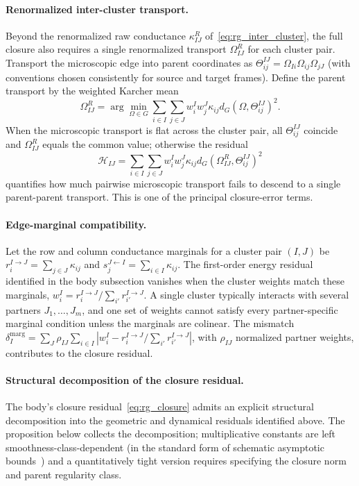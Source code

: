 \documentclass[11pt]{article}
\begin{document}
\paragraph{Renormalized inter-cluster transport.}
Beyond the renormalized raw conductance $\kappa_{IJ}^R$ of~\eqref{eq:rg_inter_cluster}, the full closure also requires a single renormalized transport $\Omega_{IJ}^R$ for each cluster pair. Transport the microscopic edge into parent coordinates as $\Theta_{ij}^{IJ} = \Omega_{Ii}\Omega_{ij}\Omega_{jJ}$ (with conventions chosen consistently for source and target frames). Define the parent transport by the weighted Karcher mean
\begin{equation}
\Omega_{IJ}^R = \arg\min_{\Omega \in G} \sum_{i \in I}\sum_{j \in J} w_i^I w_j^J \kappa_{ij} d_G(\Omega, \Theta_{ij}^{IJ})^2.
\end{equation}
When the microscopic transport is flat across the cluster pair, all $\Theta_{ij}^{IJ}$ coincide and $\Omega_{IJ}^R$ equals the common value; otherwise the residual
\begin{equation}
\mathcal{H}_{IJ} = \sum_{i \in I}\sum_{j \in J} w_i^I w_j^J \kappa_{ij} d_G(\Omega_{IJ}^R, \Theta_{ij}^{IJ})^2
\end{equation}
quantifies how much pairwise microscopic transport fails to descend to a single parent-parent transport. This is one of the principal closure-error terms.

\paragraph{Edge-marginal compatibility.}
Let the row and column conductance marginals for a cluster pair $(I, J)$ be $r_i^{I \to J} = \sum_{j \in J}\kappa_{ij}$ and $s_j^{J \leftarrow I} = \sum_{i \in I}\kappa_{ij}$. The first-order energy residual identified in the body subsection vanishes when the cluster weights match these marginals, $w_i^I = r_i^{I \to J}/\sum_{i'}r_{i'}^{I \to J}$. A single cluster typically interacts with several partners $J_1, \ldots, J_m$, and one set of weights cannot satisfy every partner-specific marginal condition unless the marginals are colinear. The mismatch $\delta_I^{\mathrm{marg}} = \sum_J \rho_{IJ}\sum_{i \in I}|w_i^I - r_i^{I \to J}/\sum_{i'}r_{i'}^{I \to J}|$, with $\rho_{IJ}$ normalized partner weights, contributes to the closure residual.

\paragraph{Structural decomposition of the closure residual.}
The body's closure residual~\eqref{eq:rg_closure} admits an explicit structural decomposition into the geometric and dynamical residuals identified above. The proposition below collects the decomposition; multiplicative constants are left smoothness-class-dependent (in the standard form of schematic asymptotic bounds~\cite{wong2001asymptotic}) and a quantitatively tight version requires specifying the closure norm and parent regularity class.
\end{document}
